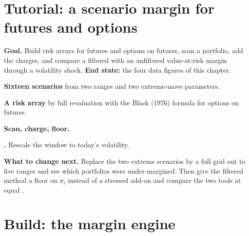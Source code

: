 \section{Tutorial: a scenario margin for futures and options}\label{tut:m1:margin:span}

\begin{tutorial}
\textbf{Goal.} Build risk arrays for futures and options on futures, scan a
portfolio, add the charges, and compare a filtered with an unfiltered
value-at-risk margin through a volatility shock. \textbf{End state:} the
four data figures of this chapter.
\begin{tutsteps}
\item \textbf{Sixteen scenarios} from two ranges and two extreme-move
parameters.
\label{lst:m1:margin:scenarios}
\item \textbf{A risk array} by full revaluation with the Black (1976)
formula for options on futures.
\label{lst:m1:margin:array}
\item \textbf{Scan, charge, floor.}
\label{lst:m1:margin:product}
\item \textbf{.} Rescale the window to today's volatility.
\label{lst:m1:margin:fhs}
\end{tutsteps}
\textbf{What to change next.} Replace the two extreme scenarios by a full
grid out to five ranges and see which portfolios were under-margined. Then
give the filtered method a floor on $\sigma_t$ instead of a stressed add-on
and compare the two tools at equal .
\end{tutorial}

\section{Build: the margin engine}\label{bld:m1:margin:engine}

